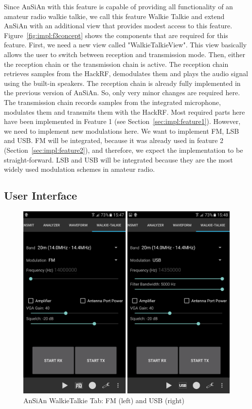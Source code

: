 Since AnSiAn with this feature is capable of providing all functionality of an amateur radio walkie talkie, we call this feature Walkie Talkie and extend AnSiAn with an additional view that provides modest access to this feature. Figure~\ref{fig:impl:f3concept} shows the components that are required for this feature. First, we need a new view called "WalkieTalkieView". This view basically allows the user to switch between reception and transmission mode. Then, either the reception chain or the transmission chain is active. The reception chain retrieves samples from the HackRF, demodulates them and plays the audio signal using the built-in speakers. The reception chain is already fully implemented in the previous version of AnSiAn. So, only very minor changes are required here. 
The transmission chain records samples from the integrated microphone, modulates them and transmits them with the HackRF. Most required parts here have been implemented in Feature 1 (see Section~\ref{sec:impl:feature1}). However, we need to implement new modulations here. We want to implement FM, LSB and USB. FM will be integrated, because it was already used in feature 2 (Section~\ref{sec:impl:feature2}), and therefore, we expect the implementation to be straight-forward. LSB and USB will be integrated because they are the most widely used modulation schemes in amateur radio. 

\subsection{User Interface}
\begin{figure}[!htbp]
	\includegraphics[width=1.0\linewidth]{gfx/screenshot_walkietalkie.png}
	\caption{AnSiAn WalkieTalkie Tab: FM (left) and USB (right)}
	\label{fig:impl:f3ui}
\end{figure}

